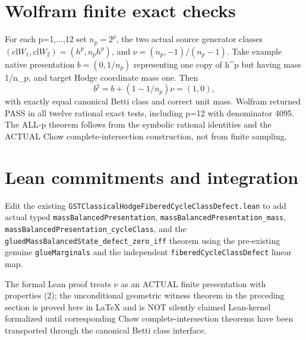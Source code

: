 \documentclass[11pt]{article}
\newcommand{\cl}{\mathrm{cl}}
\begin{document}
\section{Wolfram finite exact checks}
For each p=1,...,12 set \(n_p=2^p\),
the two actual source generator classes
\((\cl W_1,\cl W_2)=(h^p,n_p h^p)\),
and \(\nu=(n_p,-1)/(n_p-1)\).
Take example native presentation
\(b=(0,1/n_p)\) representing one copy of h^p
but having mass 1/n_p, and target Hodge
coordinate mass one. Then
\[
 b^\sharp=b+(1-1/n_p)\nu=(1,0),
\]
with exactly equal canonical Betti class and
correct unit mass. Wolfram returned PASS in
all twelve rational exact tests, including
p=12 with denominator 4095. The ALL-p theorem
follows from the symbolic rational identities
and the ACTUAL Chow complete-intersection
construction, not from finite sampling.

\section{Lean commitments and integration}
Edit the existing
\texttt{GSTClassicalHodgeFiberedCycleClassDefect.lean}
to add actual typed
\texttt{massBalancedPresentation},
\texttt{massBalancedPresentation_mass},
\texttt{massBalancedPresentation_cycleClass},
and the
\texttt{gluedMassBalancedState_defect_zero_iff}
theorem using the pre-existing genuine
\texttt{glueMarginals} and the independent
\texttt{fiberedCycleClassDefect} linear map.

The formal Lean proof treats \(\nu\) as an ACTUAL
finite presentation with properties (2);
the unconditional geometric witness theorem in
the preceding section is proved here in LaTeX
and is NOT silently claimed Lean-kernel formalized
until corresponding Chow complete-intersection
theorems have been transported through the
canonical Betti class interface.
\end{document}
